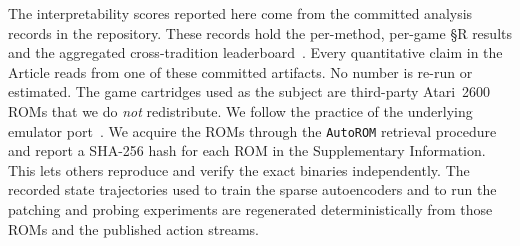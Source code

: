 %

\backmatter

The interpretability scores reported here come from the committed analysis
records in the repository. These records hold the per-method, per-game §R
results and the aggregated cross-tradition leaderboard~\cite{leaderboardP2,faithfuldemoP2}.
Every quantitative claim in the Article reads from one of these committed artifacts. No
number is re-run or estimated. The game cartridges used as the subject are
third-party Atari~2600 ROMs that we do \emph{not} redistribute. We follow the
practice of the underlying emulator port~\cite{maier2025vcs}. We acquire the ROMs through
the \texttt{AutoROM} retrieval procedure and report a SHA-256 hash for each ROM
in the Supplementary Information. This lets others reproduce and verify the exact binaries
independently. The recorded state trajectories used to
train the sparse autoencoders and to run the patching and probing experiments are
regenerated deterministically from those ROMs and the published action streams.


